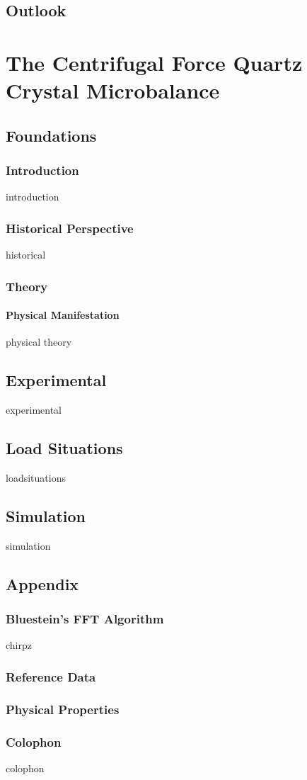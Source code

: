 \documentclass[a4paper,titlepage,onecolumn]{report}
\begin{document}
\chapter{Outlook} \label{ch:outlook}

\part{The Centrifugal Force Quartz Crystal Microbalance}
\chapter{Foundations} \label{ch:qcmfoundations}
	\section{Introduction}
	{introduction}
	\section{Historical Perspective}
	{historical}
	\section{Theory}
	\subsection{Physical Manifestation}
	{physical}
	{theory}
\chapter{Experimental} \label{ch:qcmexperimental}
{experimental}
\chapter{Load Situations} \label{ch:qcmloadsituations}
{loadsituations}
\chapter{Simulation} \label{ch:qcmsimulation}
{simulation}

\appendix
\chapter{Appendix}
 \section{Bluestein's FFT Algorithm}
 {chirpz}
	\section{Reference Data} \label{ch:reference}
	\section{Physical Properties}
	\label{ref:physicalproperties}
	\section{Colophon}
	{colophon}



\end{document}
